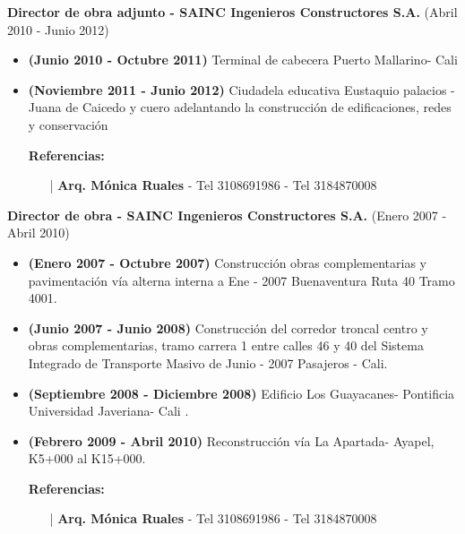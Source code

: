 \documentclass[letterpaper,10pt]{article}
\begin{document}
   \vspace*{0.1cm}
   \textbf{Director de obra adjunto - SAINC Ingenieros Constructores S.A.} (Abril 2010 - Junio 2012)
   \hfill
   \vspace*{0.1cm}
   \begin{minipage}{\linewidth}
     \begin{itemize}[noitemsep]
        \item \textbf{(Junio 2010 - Octubre 2011)} Terminal de cabecera Puerto Mallarino- Cali 
        \item \textbf{(Noviembre 2011 - Junio 2012)} Ciudadela educativa Eustaquio palacios - Juana de Caicedo y cuero adelantando la construcción de edificaciones, redes y conservación
        \item [] \textbf{Referencias:}
        \begin{itemize}[noitemsep]
          \vspace*{-0.2cm}
          \item [|] \textbf{Arq. Mónica Ruales} - Tel 3108691986 - Tel 3184870008
        \end{itemize}
     \end{itemize}
     \hfill
   \end{minipage}
 
  \vspace*{0.1cm}
  \textbf{Director de obra - SAINC Ingenieros Constructores S.A.} (Enero 2007 - Abril 2010)
  \hfill
  \vspace*{0.1cm}
  \begin{minipage}{\linewidth}
    \begin{itemize}[noitemsep]
      \item \textbf{(Enero 2007 - Octubre 2007)} Construcción obras complementarias y pavimentación vía alterna interna a Ene - 2007 Buenaventura Ruta 40 Tramo 4001.
      \item \textbf{(Junio 2007 - Junio 2008)} Construcción del corredor troncal centro y obras complementarias, tramo carrera 1 entre calles 46 y 40 del Sistema Integrado de Transporte Masivo de Junio - 2007 Pasajeros - Cali.
      \item \textbf{(Septiembre 2008 - Diciembre 2008)} Edificio Los Guayacanes- Pontificia Universidad Javeriana- Cali .
      \item \textbf{(Febrero 2009 - Abril 2010)} Reconstrucción vía La Apartada- Ayapel, K5+000 al K15+000.
      \item [] \textbf{Referencias:}
      \begin{itemize}[noitemsep]
        \vspace*{-0.2cm}
        \item [|] \textbf{Arq. Mónica Ruales} - Tel 3108691986 - Tel 3184870008
      \end{itemize}
    \end{itemize}
    \hfill
  \end{minipage}
\end{document}
